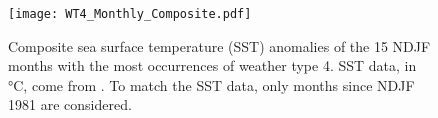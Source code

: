 \documentclass[twocol]{ametsoc}
\begin{document}
\begin{figure}
	\noindent\texttt{[image: WT4\_Monthly\_Composite.pdf]}
	\caption{
		Composite sea surface temperature (SST) anomalies of the 15 NDJF months with the most occurrences of weather type 4.
		SST data, in \si{\celsius}, come from \citet{Reynolds:2002iy}.
		To match the SST data, only months since NDJF 1981 are considered.
	}
  \label{fig:wt4-months}
\end{figure}
\end{document}
